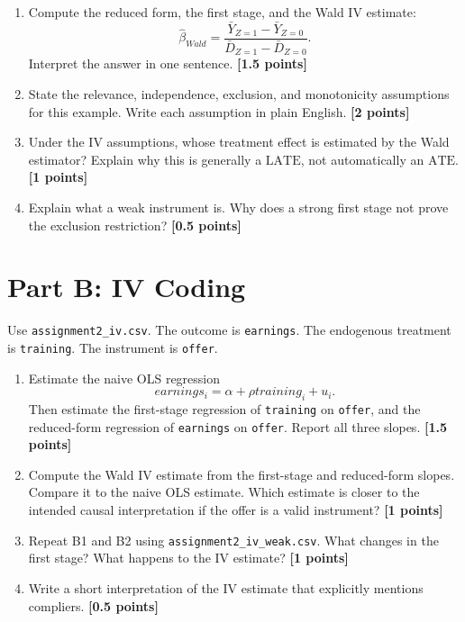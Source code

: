 \documentclass[11pt]{article}
\newcommand{\ATE}{\mathrm{ATE}}
\newcommand{\LATE}{\mathrm{LATE}}
\newcommand{\points}[1]{\hfill \textbf{[#1 points]}}
\begin{document}
\begin{enumerate}[label=A\arabic*.]
  \item Compute the reduced form, the first stage, and the Wald IV estimate:
  \[
    \hat{\beta}_{Wald}
    =
    \frac{\bar{Y}_{Z=1}-\bar{Y}_{Z=0}}
         {\bar{D}_{Z=1}-\bar{D}_{Z=0}}.
  \]
  Interpret the answer in one sentence. \points{1.5}

  \item State the relevance, independence, exclusion, and monotonicity assumptions for this example. Write each assumption in plain English. \points{2}

  \item Under the IV assumptions, whose treatment effect is estimated by the Wald estimator? Explain why this is generally a \(\LATE\), not automatically an \(\ATE\). \points{1}

  \item Explain what a weak instrument is. Why does a strong first stage not prove the exclusion restriction? \points{0.5}
\end{enumerate}

\section*{Part B: IV Coding}

Use \texttt{assignment2\_iv.csv}. The outcome is \texttt{earnings}. The endogenous treatment is \texttt{training}. The instrument is \texttt{offer}.

\begin{enumerate}[label=B\arabic*.]
  \item Estimate the naive OLS regression
  \[
    earnings_i=\alpha+\rho training_i+u_i.
  \]
  Then estimate the first-stage regression of \texttt{training} on \texttt{offer}, and the reduced-form regression of \texttt{earnings} on \texttt{offer}. Report all three slopes. \points{1.5}

  \item Compute the Wald IV estimate from the first-stage and reduced-form slopes. Compare it to the naive OLS estimate. Which estimate is closer to the intended causal interpretation if the offer is a valid instrument? \points{1}

  \item Repeat B1 and B2 using \texttt{assignment2\_iv\_weak.csv}. What changes in the first stage? What happens to the IV estimate? \points{1}

  \item Write a short interpretation of the IV estimate that explicitly mentions compliers. \points{0.5}
\end{enumerate}
\end{document}
